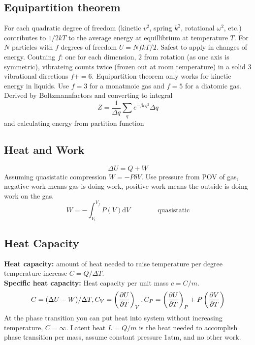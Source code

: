 \documentclass[a4paper, norsk, 8pt]{article}
\begin{document}
\begin{multicols*}{3}
\subsection*{\footnotesize  Equipartition theorem}
For each quadratic degree of freedom (kinetic $v^2$, spring $k^2$, rotational $\omega^2$, etc.) contributes to $1/2kT$ to the average energy at equillibrium at temperature $T$. For $N$ particles with $f$ degrees of freedom $U = NfkT/2$. Safest to apply in changes of energy. Coutning $f$: one for each dimension, $2$ from rotation (as one axis is symmetric), vibrateing counts twice (frozen out at room temperature) in a solid $3$ vibrational directions $f+=6$. Equipartition theorem only works for kinetic energy in liquids. Use $f=3$ for a monatmoic gas and $f=5$ for a diatomic gas.\\
Derived by Boltzmannfactors and converting to integral
\begin{equation*}
    Z = \frac{1}{\Delta q}\sum_q e^{-\beta c q^2}\Delta q
\end{equation*}
and calculating energy from partition function
\subsection*{\footnotesize  Heat and Work}
\begin{equation*}
  \Delta U = Q + W
\end{equation*}
Assuming quasistatic compression $W = -P\delta V$. Use pressure from POV of gas, negative work means gas is doing work, positive work means the outside is doing work on the gas.
\begin{equation*}
  W = -\int_{V_i}^{V_f}P(V) \mbox{d} V \qquad \qquad \text{quasistatic}
\end{equation*}

\subsection*{\footnotesize  Heat Capacity}
\textbf{Heat capacity:} amount of heat needed to raise temperature per degree temperature increase $C=Q/\Delta T$.\\
\textbf{Specific heat capacity:} Heat capacity per unit mass $c=C/m$.\\
\begin{equation*}
  C = (\Delta U - W)/\Delta T, C_V = \left(\pdv{U}{T}\right)_V, C_P = \left(\pdv{U}{T}\right)_P + P\left( \pdv{V}{T} \right)
\end{equation*}
At the phase transition you can put heat into system without increasing temperature, $C=\infty$. Latent heat $L=Q/m$ is the heat needed to accomplish phase transition per mass, assume constant pressure 1atm, and no other work.




\end{multicols*}
\end{document}
